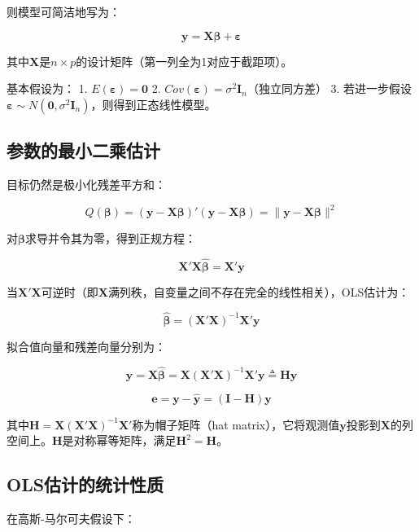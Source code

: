 \documentclass[
]{book}
\begin{document}
则模型可简洁地写为：

\[
\mathbf{y} = \mathbf{X} \boldsymbol{\beta} + \boldsymbol{\varepsilon}
\]

其中\(\mathbf{X}\)是\(n \times p\)的设计矩阵（第一列全为1对应于截距项）。

基本假设为：
1. \(E(\boldsymbol{\varepsilon}) = \mathbf{0}\)
2. \(Cov(\boldsymbol{\varepsilon}) = \sigma^2 \mathbf{I}_n\)（独立同方差）
3. 若进一步假设\(\boldsymbol{\varepsilon} \sim N(\mathbf{0}, \sigma^2 \mathbf{I}_n)\)，则得到正态线性模型。

\subsection{参数的最小二乘估计}\label{ux53c2ux6570ux7684ux6700ux5c0fux4e8cux4e58ux4f30ux8ba1-1}

目标仍然是极小化残差平方和：

\[
Q(\boldsymbol{\beta}) = (\mathbf{y} - \mathbf{X}\boldsymbol{\beta})'(\mathbf{y} - \mathbf{X}\boldsymbol{\beta}) = \|\mathbf{y} - \mathbf{X}\boldsymbol{\beta}\|^2
\]

对\(\boldsymbol{\beta}\)求导并令其为零，得到正规方程：

\[
\mathbf{X}'\mathbf{X} \hat{\boldsymbol{\beta}} = \mathbf{X}'\mathbf{y}
\]

当\(\mathbf{X}'\mathbf{X}\)可逆时（即\(\mathbf{X}\)满列秩，自变量之间不存在完全的线性相关），OLS估计为：

\[
\hat{\boldsymbol{\beta}} = (\mathbf{X}'\mathbf{X})^{-1} \mathbf{X}'\mathbf{y}
\]

拟合值向量和残差向量分别为：

\[
\hat{\mathbf{y}} = \mathbf{X}\hat{\boldsymbol{\beta}} = \mathbf{X}(\mathbf{X}'\mathbf{X})^{-1}\mathbf{X}'\mathbf{y} \triangleq \mathbf{H}\mathbf{y}
\]

\[
\mathbf{e} = \mathbf{y} - \hat{\mathbf{y}} = (\mathbf{I} - \mathbf{H})\mathbf{y}
\]

其中\(\mathbf{H} = \mathbf{X}(\mathbf{X}'\mathbf{X})^{-1}\mathbf{X}'\)称为帽子矩阵（hat matrix），它将观测值\(\mathbf{y}\)投影到\(\mathbf{X}\)的列空间上。\(\mathbf{H}\)是对称幂等矩阵，满足\(\mathbf{H}^2 = \mathbf{H}\)。

\subsection{OLS估计的统计性质}\label{olsux4f30ux8ba1ux7684ux7edfux8ba1ux6027ux8d28}

在高斯-马尔可夫假设下：
\end{document}
